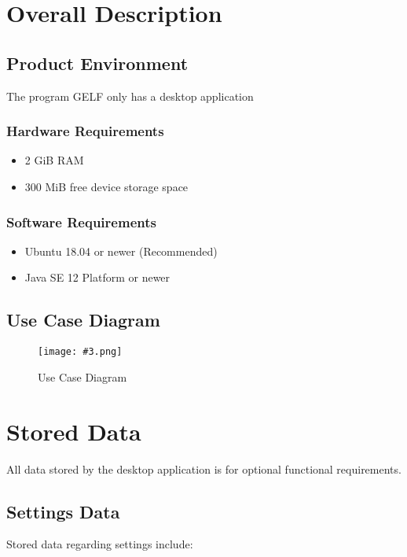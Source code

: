 \documentclass[10pt,a4paper]{report}
\newcommand{\includeimage}[5]{
    \begin{figure}[H]
        #1
        \texttt{[image: \#3.png]}
        \caption{#4}
        \label{fig:#5}
    \end{figure}
}
\begin{document}
\chapter{Overall Description}
\section{Product Environment}
The program GELF only has a desktop application
\subsection{Hardware Requirements}
\begin{itemize}
    \item 2 GiB RAM
    \item 300 MiB free device storage space
\end{itemize}
\subsection{Software Requirements}
\begin{itemize}
    \item Ubuntu 18.04 or newer (Recommended)
    \item Java SE 12 Platform or newer
\end{itemize}

\section{Use Case Diagram}
\includeimage{}{0.24}{Use Case}{Use Case Diagram}{}

\chapter{Stored Data}
All data stored by the desktop application is for optional functional requirements.

\section{Settings Data}

Stored data regarding settings include:
\end{document}
